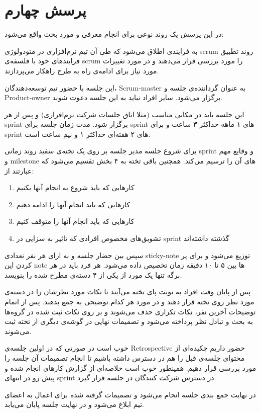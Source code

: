 
\section{پرسش چهارم}
در این پرسش یک روند نوعی برای انجام 
معرفی و مورد بحث واقع می‌شود:

\vspace*{3cm}

به فرایندی اطلاق می‌شود که طی آن تیم نرم‌افزاری در متودولوژی scrum روند تطبیق فرایند‌های خود با فلسفه‌ی scrum را مورد بررسی قرار می‌دهند و در مورد تغییرات مورد نیاز برای ادامه‌ی راه به طرح راهکار می‌پردازند.

این جلسه با حضور تیم توسعه‌دهندگان، Scrum-master به عنوان گرداننده‌ی جلسه و Product-owner برگزار می‌شود. سایر افراد نباید به این جلسه دعوت شوند.

این جلسه باید در مکانی مناسب (مثلا اتاق جلسات شرکت نرم‌افزاری)  و پس از هر sprint برگزار شود. مدت زمان جلسه برای sprint های ۱ ماهه حداکثر ۳ ساعت و برای sprint های  ۲ هفته‌ای حداکثر ۱ و نیم ساعت است.


برای شروع جلسه مدیر جلسه بر روی یک تخته‌ی سفید روند زمانی sprint و وقایع مهم و milestone های آن را ترسیم می‌کند. همچنین باقی تخته به ۴ بخش تقسیم می‌شود که عبارتند از:

\begin{enumerate}
\item کار‌هایی که باید شروع به انجام آنها بکنیم
\item کار‌هایی که باید انجام آنها را ادامه دهیم
\item کار‌هایی که باید انجام آنها را متوقف کنیم
\item تشویق‌های مخصوص افرادی که تاثیر به سزایی در sprint گذشته داشته‌اند
\end{enumerate}


سپس بین حضار جلسه و به ازای هر نفر تعدادی sticky-note توزیع می‌شود و برای پر کردن این note ها بین ۵ تا ۱۰ دقیقه زمان تخصیص داده می‌شود. هر فرد باید در هر برگه تنها یک مورد از یکی از ۴ دسته‌ی مطرح شده را بنویسد. 

پس از پایان وقت افراد به نوبت پای تخته می‌آیند تا نکات مورد نظرشان را در دسته‌ی مورد نظر روی تخته قرار دهند و در مورد هر کدام توضیحی به جمع بدهند. پس از اتمام توضیحات آخرین نفر، نکات تکراری حذف می‌شوند و بر روی نکات ثبت شده در گروه‌ها به بحث و تبادل نظر پرداخته می‌شود و تصمیمات نهایی در گوشه‌ی دیگری از تخته ثبت می‌شوند.

خوب است در صورتی که در اولین جلسه‌ی Retrospective حضور داریم چکیده‌ای از محتوای جلسه‌ی قبل را هم در دسترس داشته باشیم تا انجام تصمیمات آن جلسه را مورد بررسی قرار دهیم. همینطور خوب است خلاصه‌ای از گزارش کار‌های انجام شده و پیش رو در انتها‌ی sprint در دسترس شرکت کنندگان در جلسه قرار گیرد.

در نهایت جمع بندی جلسه انجام می‌شود و تصمیمات گرفته شده برای اعمال به اعضای تیم ابلاغ می‌شود و در نهایت جلسه پایان می‌یابد.
\cite{retrospective}
